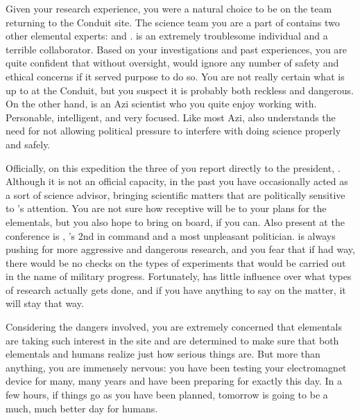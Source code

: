 \documentclass[char]{elementals}
\begin{document}
Given your research experience, you were a natural choice to be on the team returning to the Conduit site. The science team you are a part of contains two other elemental experts: \cMS{\intrp} and \cScientist{\intro}. \cMS{} is an extremely troublesome individual and a terrible collaborator. Based on your investigations and past experiences, you are quite confident that without oversight, \cMS{\they} would ignore any number of safety and ethical concerns if it served \cMS{\their} purpose to do so. You are not really certain what \cMS{\they} is up to at the Conduit, but you suspect it is probably both reckless and dangerous. On the other hand, \cScientist{} is an Azi scientist who you quite enjoy working with. Personable, intelligent, and very focused. Like most Azi, \cScientist{\they} also understands the need for not allowing political pressure to interfere with doing science properly and safely.

Officially, on this expedition the three of you report directly to the president, \cLeader{\intro}. Although it is not an official capacity, in the past you have occasionally acted as a sort of science advisor, bringing scientific matters that are politically sensitive to \cLeader{}'s attention. You are not sure how receptive \cLeader{\they} will be to your plans for the elementals, but you also hope to bring \cLeader{\them} on board, if you can. Also present at the conference is \cDema{\intro}, \cLeader{}'s 2nd in command and a most unpleasant politician. \cDema{\They} is always pushing for more aggressive and dangerous research, and you fear that if \cDema{\they} had \cDema{\their} way, there would be no checks on the types of experiments that would be carried out in the name of military progress. Fortunately, \cDema{\they} has little influence over what types of research actually gets done, and if you have anything to say on the matter, it will stay that way.

Considering the dangers involved, you are extremely concerned that elementals are taking such interest in the site and are determined to make sure that both elementals and humans realize just how serious things are. But more than anything, you are immensely nervous: you have been testing your electromagnet device for many, many years and have been preparing for exactly this day. In a few hours, if things go as you have been planned, tomorrow is going to be a much, much better day for humans.

\end{document}
